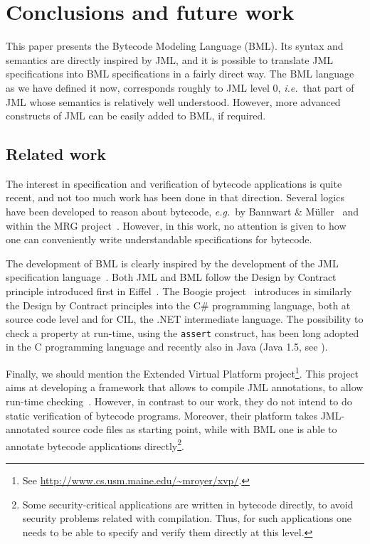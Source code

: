 \section{Conclusions and future work}\label{SecConcl}

This paper presents the Bytecode Modeling Language (BML). Its syntax
and semantics are directly inspired by JML, and it is possible to
translate JML specifications into BML specifications in a fairly
direct way. The BML language as we have defined it now, corresponds
roughly to JML level 0, \emph{i.e.}\ that part of JML whose semantics
is relatively well understood. However, more advanced constructs of
JML can be easily added to BML, if required. 

\subsection{Related work}
The interest in specification and verification of bytecode
applications is quite recent, and not too much work has been done in
that direction. Several logics have been developed to reason about
bytecode, \emph{e.g.}~by Bannwart \& M\"uller~\cite{BannwartMueller05}
and within the MRG project~\cite{AspinallEtAl:TPHOLs2004}. However,
in this work, no attention is given to how one can conveniently write
understandable specifications for bytecode.

The development of BML is clearly inspired by the development of the
JML specification language~\cite{JMLReferenceManual05}. Both JML and
BML follow the Design by Contract principle introduced first in
Eiffel~\cite{Meyer97}. The Boogie project~\cite{BarnettCDJL05}
introduces in similarly the Design by Contract principles into the C\#
programming language, both at source code level and for CIL, the .NET
intermediate language.  The possibility to check a property at
run-time, using the \texttt{assert} construct, has been long 
adopted in the C programming language and recently also in Java (Java
1.5, see \cite[\S 14.10]{JLS}). 

Finally, we should mention the Extended Virtual Platform
project\footnote{See
\url{http://www.cs.usm.maine.edu/~mroyer/xvp/}.}. This project aims at
developing a framework that allows to compile JML annotations, to
allow run-time checking~\cite{AlagicXVP05}. However, in contrast to
our work, they do not intend to do static verification of bytecode
programs. Moreover, their platform takes JML-annotated source code
files as starting point, while with BML one is able to annotate
bytecode applications directly\footnote{Some security-critical
applications are written in bytecode directly, to avoid security
problems related with compilation. Thus, for such applications one
needs to be able to specify and verify them directly at this level.}.

